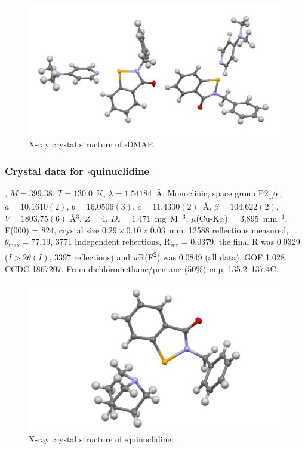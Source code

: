 \begin{refsection}
    \begin{figure}
      \includegraphics[width=0.6\linewidth]{Figures/ebs-bn-dmap-xtal.pdf}
      \caption{X-ray crystal structure of \texorpdfstring{$ \cdot $DMAP}{C21H21N3OSe}.}
    \end{figure}
    
    \subsubsection{Crystal data for \texorpdfstring{$ \cdot $quinuclidine}{C21H24N2OSe}}
    , $M=399.38$, $T=130.0$~K, $\lambda=1.54184$~\AA, Monoclinic, space group P2\textsubscript{1}/c, $a = 10.1610(2)$, $b = 16.0506(3)$, $c = 11.4300(2)$~\AA, $\beta = 104.622(2)$\degree, $V = 1803.75(6)$ \AA$^{3}$, $Z = 4$.
    $D_{c}= 1.471$~mg~M$^{-3}$, $\mu$(Cu-K$\alpha$) = 3.895~mm$^{-1}$, F(000) = 824, crystal size $0.29 \times 0.10 \times 0.03$~mm.
    12588 reflections measured, $\theta_{\max} = 77.19$\degree, 3771 independent reflections, R\textsubscript{int} = 0.0379, the final R was 0.0329 ($I > 2\theta(I)$, 3397 reflections) and \textit{w}R(F\textsuperscript{2}) was 0.0849 (all data), GOF 1.028.
    CCDC 1867207.
    From dichloromethane/pentane (50\%) m.p. 135.2--137.4\degree{}C.
    
    \begin{figure}
      \includegraphics[width=0.6\linewidth]{Figures/ebs-bn-quin-xtal.pdf}
      \caption{X-ray crystal structure of \texorpdfstring{$ \cdot $quinuclidine}{C21H24N2OSe}.}
    \end{figure}
    

\end{refsection}

